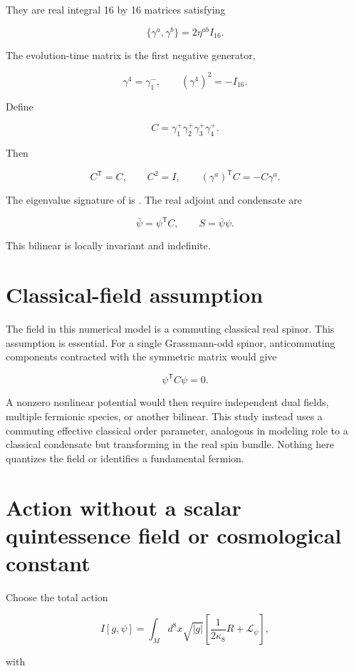 \documentclass[11pt]{article}
\begin{document}
They are real integral 16 by 16 matrices satisfying

\[
\{\gamma^a,\gamma^b\}=2\eta^{ab}I_{16}.
\]

The evolution-time matrix is the first negative generator,

\[
\gamma^4=\gamma_1^-,
\qquad (\gamma^4)^2=-I_{16}.
\]

Define

\[
C=\gamma_1^+\gamma_2^+\gamma_3^+\gamma_4^+.
\]

Then

\[
C^{\mathsf T}=C,
\qquad C^2=I,
\qquad
(\gamma^a)^{\mathsf T}C=-C\gamma^a.
\]

The eigenvalue signature of \texttt{} is \texttt{}. The real adjoint and condensate are

\[
\bar\psi=\psi^{\mathsf T}C,
\qquad
S=\bar\psi\psi.
\]

This bilinear is locally \texttt{} invariant and indefinite.

\section{Classical-field assumption}

The field in this numerical model is a commuting classical real spinor. This assumption is essential. For a single Grassmann-odd spinor, anticommuting components contracted with the symmetric matrix \texttt{} would give

\[
\psi^{\mathsf T}C\psi=0.
\]

A nonzero nonlinear potential \texttt{} would then require independent dual fields, multiple fermionic species, or another bilinear. This study instead uses a commuting effective classical order parameter, analogous in modeling role to a classical condensate but transforming in the real spin bundle. Nothing here quantizes the field or identifies a fundamental fermion.

\section{Action without a scalar quintessence field or cosmological constant}

Choose the total action

\[
I[g,\psi]
=\int_M d^8x\sqrt{|g|}
\left[\frac{1}{2\kappa_8}R+\mathcal L_\psi\right],
\]

with
\end{document}
